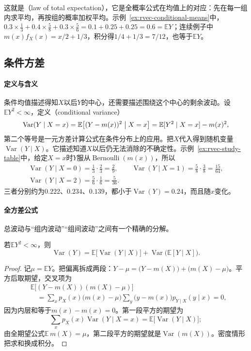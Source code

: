 这就是（law of total expectation），它是全概率公式在均值上的对应：先在每一组内求平均，再按组的概率加权平均。示例~\ref{ex:rvec-conditional-means}中，$0.3\times\frac13+0.4\times\frac58+0.3\times\frac56=0.1+0.25+0.25=0.6=\mathbb EY$；连续例子中$m(x)f_X(x)=x/2+1/3$，积分得$1/4+1/3=7/12$，也等于$\mathbb EY$。

\subsection{条件方差}
\label{sec:rvec-conditional-variance}

\paragraph{定义与含义}
条件均值描述得知$X$以后$Y$的中心，还需要描述围绕这个中心的剩余波动。设$\mathbb EY^2<\infty$，定义（conditional variance）
\[
 \operatorname{Var}(Y\mid X=x)=\mathbb E\bigl[(Y-m(x))^2\bigm| X=x\bigr]=\mathbb E[Y^2\mid X=x]-m(x)^2 ,
\]
第二个等号是一元方差计算公式在条件分布上的应用。把$X$代入得到随机变量$\operatorname{Var}(Y\mid X)$。它描述知道$X$以后仍无法消除的不确定性。示例~\ref{ex:rvec-study-table}中，给定$X=x$时$Y$服从$\operatorname{Bernoulli}(m(x))$，所以
\[
\begin{gathered}
 \operatorname{Var}(Y\mid X=0)=\frac13\cdot\frac23=\frac29,\qquad
 \operatorname{Var}(Y\mid X=1)=\frac58\cdot\frac38=\frac{15}{64},\\
 \operatorname{Var}(Y\mid X=2)=\frac56\cdot\frac16=\frac5{36}.
\end{gathered}
\]
三者分别约为$0.222$、$0.234$、$0.139$，都小于$\operatorname{Var}(Y)=0.24$，而且随$x$变化。

\paragraph{全方差公式}
总波动与“组内波动”“组间波动”之间有一个精确的分解。

\begin{theorem}[全方差公式]
\label{thm:rvec-total-variance}
若$\mathbb EY^2<\infty$，则
\[
 \operatorname{Var}(Y)=\mathbb E\bigl[\operatorname{Var}(Y\mid X)\bigr]+\operatorname{Var}\bigl(\mathbb E[Y\mid X]\bigr).
\]
\end{theorem}

\begin{proof}
记$\mu=\mathbb EY$。把偏离拆成两段：$Y-\mu=\bigl(Y-m(X)\bigr)+\bigl(m(X)-\mu\bigr)$。平方后取期望，交叉项为
\[
\begin{aligned}
 &\mathbb E\bigl[(Y-m(X))(m(X)-\mu)\bigr]\\
 &\quad=\sum_xp_X(x)\bigl(m(x)-\mu\bigr)\sum_y\bigl(y-m(x)\bigr)p_{Y\mid X}(y\mid x)=0 ,
\end{aligned}
\]
因为内层和等于$m(x)-m(x)=0$。第一段平方的期望为
\[
 \sum_xp_X(x)\operatorname{Var}(Y\mid X=x)=\mathbb E\bigl[\operatorname{Var}(Y\mid X)\bigr];
\]
由全期望公式$\mathbb E\,m(X)=\mu$，第二段平方的期望就是$\operatorname{Var}(m(X))$。密度情形把求和换成积分。
\end{proof}

